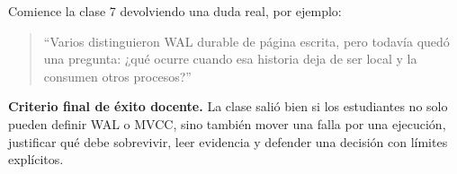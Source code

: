 \documentclass[variant=docente,cover=institutional,mode=screen]{ua-engineering-v6-article}
\begin{document}
Comience la clase 7 devolviendo una duda real, por ejemplo:

\begin{quote}
``Varios distinguieron WAL durable de página escrita, pero todavía quedó una pregunta: ¿qué ocurre cuando esa historia deja de ser local y la consumen otros procesos?''
\end{quote}

\begin{uakeybox}
\textbf{Criterio final de éxito docente.} La clase salió bien si los estudiantes no solo pueden definir WAL o MVCC, sino también mover una falla por una ejecución, justificar qué debe sobrevivir, leer evidencia y defender una decisión con límites explícitos.
\end{uakeybox}
\end{document}
